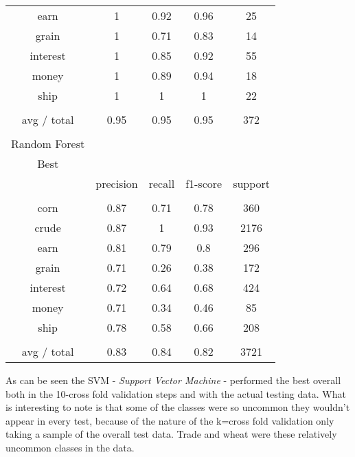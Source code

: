 \documentclass[11pt]{article}
\begin{document}
\begin{center}
\begin{longtable}{| c | c | c | c | c |}
earn          & 1         & 0.92   & 0.96     & 25      \\
grain         & 1         & 0.71   & 0.83     & 14      \\
interest      & 1         & 0.85   & 0.92     & 55      \\
money         & 1         & 0.89   & 0.94     & 18      \\
ship          & 1         & 1      & 1        & 22      \\
             &           &        &          &         \\
avg / total   & 0.95      & 0.95   & 0.95     & 372     \\
             &           &        &          &         \\
Random Forest &           &        &          &         \\
Best          &           &        &          &         \\
             & precision & recall & f1-score & support \\
             &           &        &          &         \\
corn          & 0.87      & 0.71   & 0.78     & 360     \\
crude         & 0.87      & 1      & 0.93     & 2176    \\
earn          & 0.81      & 0.79   & 0.8      & 296     \\
grain         & 0.71      & 0.26   & 0.38     & 172     \\
interest      & 0.72      & 0.64   & 0.68     & 424     \\
money         & 0.71      & 0.34   & 0.46     & 85      \\
ship          & 0.78      & 0.58   & 0.66     & 208     \\
             &           &        &          &         \\
avg / total   & 0.83      & 0.84   & 0.82     & 3721  
\end{longtable}
\end{center}

As can be seen the SVM - \textit{Support Vector Machine} - performed the best overall both in the 10-cross fold validation steps and with the actual testing data. What is interesting to note is that some of the classes were so uncommon they wouldn't appear in every test, because of the nature of the k=cross fold validation only taking a sample of the overall test data. Trade and wheat were these relatively uncommon classes in the data. \\
\end{document}
